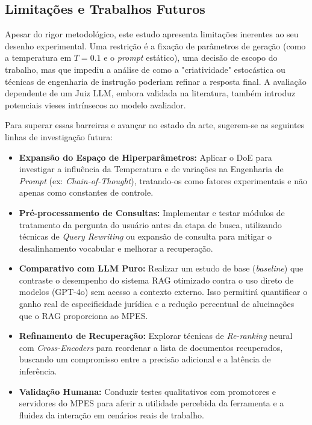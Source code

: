 \subsection{Limitações e Trabalhos Futuros}

Apesar do rigor metodológico, este estudo apresenta limitações inerentes ao seu desenho experimental. Uma restrição é a fixação de parâmetros de geração (como a temperatura em $T = 0.1$ e o \textit{prompt} estático), uma decisão de escopo do trabalho, mas que impediu a análise de como a "criatividade" estocástica ou técnicas de engenharia de instrução poderiam refinar a resposta final. A avaliação dependente de um Juiz LLM, embora validada na literatura, também introduz potenciais vieses intrínsecos ao modelo avaliador.

Para superar essas barreiras e avançar no estado da arte, sugerem-se as seguintes linhas de investigação futura:

\begin{itemize}
  \item \textbf{Expansão do Espaço de Hiperparâmetros:} Aplicar o DoE para investigar a influência da Temperatura e de variações na Engenharia de \textit{Prompt} (ex: \textit{Chain-of-Thought}), tratando-os como fatores experimentais e não apenas como constantes de controle.
  \item \textbf{Pré-processamento de Consultas:} Implementar e testar módulos de tratamento da pergunta do usuário antes da etapa de busca, utilizando técnicas de \textit{Query Rewriting} ou expansão de consulta para mitigar o desalinhamento vocabular e melhorar a recuperação.
  \item \textbf{Comparativo com LLM Puro:} Realizar um estudo de base (\textit{baseline}) que contraste o desempenho do sistema RAG otimizado contra o uso direto de modelos (GPT-4o) sem acesso a contexto externo. Isso permitirá quantificar o ganho real de especificidade jurídica e a redução percentual de alucinações que o RAG proporciona ao MPES.
  \item \textbf{Refinamento de Recuperação:} Explorar técnicas de \textit{Re-ranking} neural com \textit{Cross-Encoders} para reordenar a lista de documentos recuperados, buscando um compromisso entre a precisão adicional e a latência de inferência.
  \item \textbf{Validação Humana:} Conduzir testes qualitativos com promotores e servidores do MPES para aferir a utilidade percebida da ferramenta e a fluidez da interação em cenários reais de trabalho.
\end{itemize}
